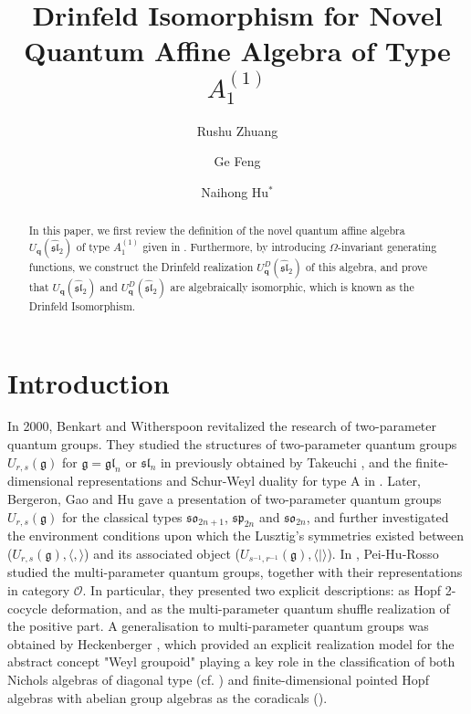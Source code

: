 \documentclass[12pt]{amsart}
\title{Drinfeld Isomorphism for Novel Quantum Affine Algebra of Type \(A_{1}^{(1)}\)}
\author[R.S. Zhuang]{Rushu Zhuang}
\author[G. Feng]{Ge Feng}
\author[N.H. Hu]{Naihong Hu$^*$}
\numberwithin{equation}{section}
\numberwithin{equation}{section}
\begin{document}
\begin{abstract}
In this paper, we first review the definition of the novel quantum affine algebra \(U_{\textbf{q}}(\widehat{\mathfrak{sl}}_2)\) of type \(A_{1}^{(1)}\) given in \cite{FHZ, HZhuang}. Furthermore, by introducing \(\Omega\)-invariant generating functions, we construct the Drinfeld realization \(U^{D}_{\textbf{q}}(\widehat{\mathfrak{sl}}_2)\) of this algebra, and prove that \(U_{\textbf{q}}(\widehat{\mathfrak{sl}}_2)\) and \(U^{D}_{\textbf{q}}(\widehat{\mathfrak{sl}}_2)\) are algebraically isomorphic, which is known as the Drinfeld Isomorphism.
\end{abstract}


\maketitle
\tableofcontents

\section{Introduction}
In 2000, Benkart and Witherspoon revitalized the research of two-parameter quantum groups. They studied the structures of two-parameter quantum groups \(U_{r, s}(\mathfrak{g})\) for \(\mathfrak{g}=\mathfrak{gl}_n\) or \(\mathfrak{sl}_n\) in \cite{BW1} previously obtained by Takeuchi \cite{T}, and the finite-dimensional representations and Schur-Weyl duality for type A in \cite{BW2}.
Later, Bergeron, Gao and Hu \cite{BGH} gave a presentation of two-parameter quantum groups \(U_{r,s}(\mathfrak{g})\) for the classical types \(\mathfrak{so}_{2n+1}\), \(\mathfrak{sp}_{2n}\) and \(\mathfrak{so}_{2n}\), and 
further investigated the environment conditions upon which the Lusztig’s symmetries existed between
(\(U_{r,s}(\mathfrak{g}), \langle,\rangle\)) and its associated object (\(U_{s^{-1},r^{-1}}(\mathfrak{g}), \langle|\rangle\)). 
In \cite{PHR}, Pei-Hu-Rosso studied the multi-parameter quantum groups, together with their representations in category \(\mathcal{O}\). In particular, they presented two explicit descriptions: as Hopf 2-cocycle deformation, and as the multi-parameter quantum shuffle realization of the positive part.
A generalisation to multi-parameter quantum groups was obtained by Heckenberger \cite{H1}, which provided an explicit realization model for the abstract concept "Weyl groupoid" playing a key role in the classification of both Nichols algebras of diagonal type (cf. \cite{H2}) and finite-dimensional pointed Hopf algebras with abelian group algebras as the coradicals (\cite{AS}).
\end{document}
